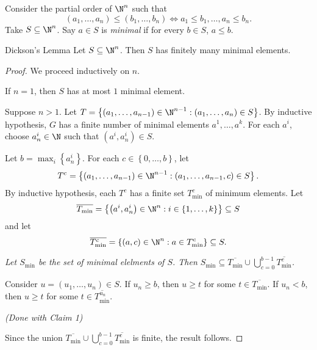 \documentclass[co439]{subfiles}
\begin{document}
    \rruleline

    \clearpage
    
    \np Consider the partial order of $\N^n$ such that
    \begin{equation*}
        \left( a_1,\ldots,a_n \right)\leq\left( b_1,\ldots,b_n \right) \iff a_1\leq b_1, \ldots, a_n\leq b_n.
    \end{equation*}
    Take $S\subseteq\N^n$. Say $a\in S$ is \emph{minimal} if for every $b\in S$, $a\leq b$.

    \begin{theorem}{Dickson's Lemma}
        Let $S\subseteq\N^n$. Then $S$ has finitely many minimal elements.
    \end{theorem}
    
    \begin{proof}
        We proceed inductively on $n$.

        If $n=1$, then $S$ has at most $1$ minimal element.

        Suppose $n>1$. Let $T = \left\lbrace \left( a_1,\ldots,a_{n-1} \right)\in\N^{n-1}: \left( a_1,\ldots,a_n \right)\in S \right\rbrace$. By inductive hypothesis, $G$ has a finite number of minimal elements $a^1,\ldots,a^k$. For each $a^i$, choose $a^i_n\in\N$ such that $\left( a^i,a^i_n \right) \in S$. 

        Let $b = \max_i\left\lbrace a^i_n \right\rbrace$. For each $c\in\left\lbrace 0,\ldots,b \right\rbrace$, let
        \begin{equation*}
            T^c = \left\lbrace \left( a_1,\ldots,a_{n-1} \right)\in\N^{n-1}:\left( a_1,\ldots,a_{n-1},c \right)\in S \right\rbrace.
        \end{equation*}
        By inductive hypothesis, each $T^c$ has a finite set $T^c_{\min}$ of minimum elements. Let
        \begin{equation*}
            \overline{T_{\min}} = \left\lbrace \left( a^i,a^i_n \right)\in\N^n : i\in\left\lbrace 1,\ldots,k \right\rbrace \right\rbrace\subseteq S
        \end{equation*}
        and let
        \begin{equation*}
            \overline{T^c_{\min}} = \left\lbrace \left( a,c \right)\in\N^n: a\in T^c_{\min} \right\rbrace \subseteq S.
        \end{equation*}

        \begin{subproof}[Claim 1]
            \textit{Let $S_{\min}$ be the set of minimal elelments of $S$. Then $S_{\min}\subseteq\overline{T_{\min}}\cup\bigcup^{b-1}_{c=0}\overline{T^c_{\min}}$.}
            
            Consider $u = \left( u_1,\ldots,u_n \right)\in S$. If $u_n\geq b$, then $u\geq t$ for some $t\in\overline{T_{\min}}$. If $u_n<b$, then $u\geq t$ for some $t\in \overline{T^{u_n}_{\min}}$.

            \hfill\textit{(Done with Claim 1)}
        \end{subproof}

        Since the union $\overline{T_{\min}}\cup\bigcup^{b-1}_{c=0}\overline{T^c_{\min}}$ is finite, the result follows.
    \end{proof}
\end{document}
